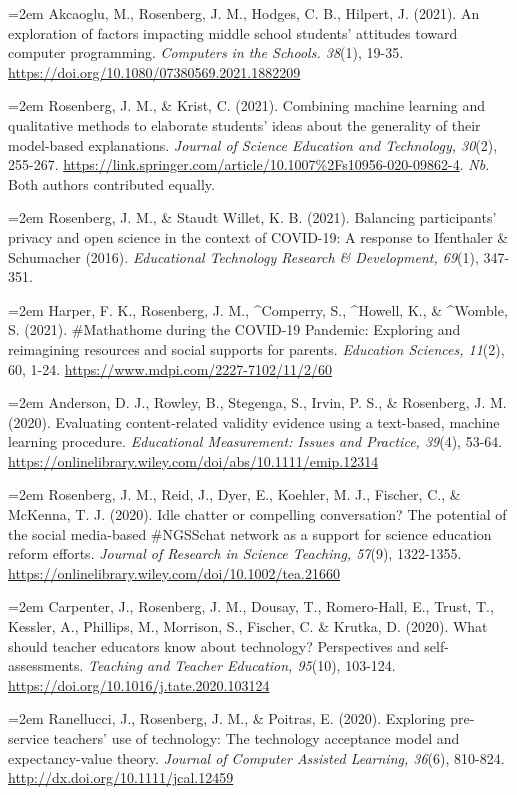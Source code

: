 \documentclass[
  14,
]{article}
\begin{document}
\hangindent=2em Akcaoglu, M., Rosenberg, J. M., Hodges, C. B., Hilpert,
J. (2021). An exploration of factors impacting middle school students'
attitudes toward computer programming. \emph{Computers in the Schools.
38}(1), 19-35. \url{https://doi.org/10.1080/07380569.2021.1882209}

\hangindent=2em Rosenberg, J. M., \& Krist, C. (2021). Combining machine
learning and qualitative methods to elaborate students' ideas about the
generality of their model-based explanations. \emph{Journal of Science
Education and Technology, 30}(2), 255-267.
\url{https://link.springer.com/article/10.1007\%2Fs10956-020-09862-4}.
\emph{Nb.} Both authors contributed equally.

\hangindent=2em Rosenberg, J. M., \& Staudt Willet, K. B. (2021).
Balancing participants' privacy and open science in the context of
COVID-19: A response to Ifenthaler \& Schumacher (2016).
\emph{Educational Technology Research \& Development, 69}(1), 347-351.

\hangindent=2em Harper, F. K., Rosenberg, J. M., \^{}Comperry, S.,
\^{}Howell, K., \& \^{}Womble, S. (2021). \#Mathathome during the
COVID-19 Pandemic: Exploring and reimagining resources and social
supports for parents. \emph{Education Sciences, 11}(2), 60, 1-24.
\url{https://www.mdpi.com/2227-7102/11/2/60}

\hangindent=2em Anderson, D. J., Rowley, B., Stegenga, S., Irvin, P. S.,
\& Rosenberg, J. M. (2020). Evaluating content-related validity evidence
using a text-based, machine learning procedure. \emph{Educational
Measurement: Issues and Practice, 39}(4), 53-64.
\url{https://onlinelibrary.wiley.com/doi/abs/10.1111/emip.12314}

\hangindent=2em Rosenberg, J. M., Reid, J., Dyer, E., Koehler, M. J.,
Fischer, C., \& McKenna, T. J. (2020). Idle chatter or compelling
conversation? The potential of the social media-based \#NGSSchat network
as a support for science education reform efforts. \emph{Journal of
Research in Science Teaching, 57}(9), 1322-1355.
\url{https://onlinelibrary.wiley.com/doi/10.1002/tea.21660}

\hangindent=2em Carpenter, J., Rosenberg, J. M., Dousay, T.,
Romero-Hall, E., Trust, T., Kessler, A., Phillips, M., Morrison, S.,
Fischer, C. \& Krutka, D. (2020). What should teacher educators know
about technology? Perspectives and self-assessments. \emph{Teaching and
Teacher Education, 95}(10), 103-124.
\url{https://doi.org/10.1016/j.tate.2020.103124}

\hangindent=2em Ranellucci, J., Rosenberg, J. M., \& Poitras, E. (2020).
Exploring pre-service teachers' use of technology: The technology
acceptance model and expectancy-value theory. \emph{Journal of Computer
Assisted Learning, 36}(6), 810-824.
\url{http://dx.doi.org/10.1111/jcal.12459}
\end{document}
